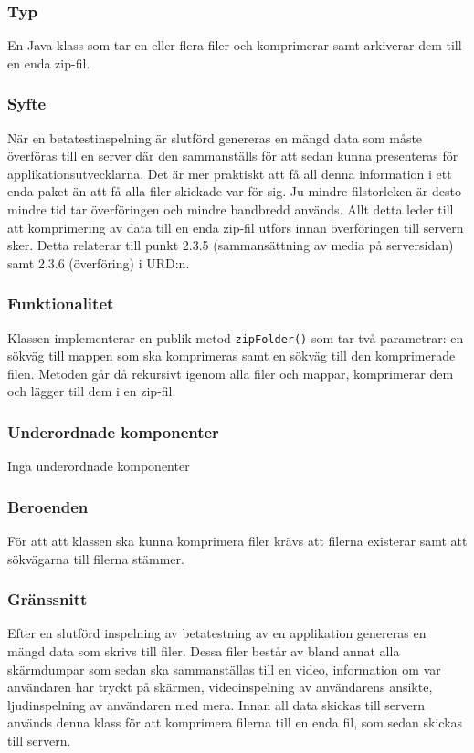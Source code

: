\subsubsection{Typ}
En Java-klass som tar en eller flera filer och komprimerar samt arkiverar dem till en enda zip-fil. 

\subsubsection{Syfte}
När en betatestinspelning är slutförd genereras en mängd data som måste överföras till en server där den sammanställs för att sedan kunna presenteras för applikationsutvecklarna. Det är mer praktiskt att få all denna information i ett enda paket än att få alla filer skickade var för sig. Ju mindre filstorleken är desto mindre tid tar överföringen och mindre bandbredd används. Allt detta leder till att komprimering av data till en enda zip-fil utförs innan överföringen till servern sker. Detta relaterar till punkt 2.3.5 (sammansättning av media på serversidan) samt 2.3.6 (överföring) i URD:n. 

\subsubsection{Funktionalitet}
Klassen implementerar en publik metod \verb:zipFolder(): som tar två parametrar: en sökväg till mappen som ska komprimeras samt en sökväg till den komprimerade filen. Metoden går då rekursivt igenom alla filer och mappar, komprimerar dem och lägger till dem i en zip-fil. 

\subsubsection{Underordnade komponenter}
Inga underordnade komponenter

\subsubsection{Beroenden}
För att att klassen ska kunna komprimera filer krävs att filerna existerar samt att sökvägarna till filerna stämmer. 

\subsubsection{Gränssnitt}
Efter en slutförd inspelning av betatestning av en applikation genereras en mängd data som skrivs till filer. Dessa filer består av bland annat alla skärmdumpar som sedan ska sammanställas till en video, information om var användaren har tryckt på skärmen, videoinspelning av användarens ansikte, ljudinspelning av användaren med mera. Innan all data skickas till servern används denna klass för att komprimera filerna till en enda fil, som sedan skickas till servern. 

